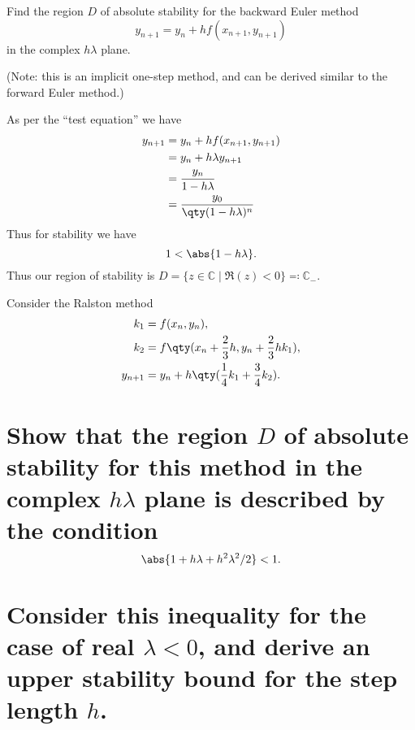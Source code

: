 \documentclass[boxes,pages]{homework}
\begin{document}
\begin{problem}
Find the region $D$ of absolute stability for the backward Euler method
\[
	y_{n+1} = y_n + hf(x_{n+1}, y_{n+1})
\]
in the complex $h\lambda$ plane.

(Note: this is an implicit one-step method, and can be derived similar to the forward Euler method.)
\end{problem}

\begin{solution}
	As per the ``test equation'' we have
	\begin{align*}
		y_{n+1} & = y_n + hf(x_{n+1}, y_{n+1})       \\
		        & = y_n + h\lambda y_{n+1}           \\
		        & = \frac{y_n}{1 - h\lambda}         \\
		        & = \frac{y_0}{\qty(1 - h\lambda)^n}
	\end{align*}
	Thus for stability we have
	\begin{equation*}
		1 < \abs{1 - h\lambda}.
	\end{equation*}
	Thus our region of stability is $D = \{z\in\mathbb{C}\mid \Re(z) < 0 \} \eqqcolon \mathbb{C}_-$.
\end{solution}

\begin{problem}
Consider the Ralston method
\begin{align*}
	k_1     & = f(x_n, y_n),                                      \\
	k_2     & = f\qty(x_n + \frac{2}{3}h, y_n + \frac{2}{3}hk_1), \\
	y_{n+1} & = y_n + h\qty(\frac{1}{4}k_1 + \frac{3}{4}k_2).
\end{align*}
\begin{parts}
	\part{Show that the region $D$ of absolute stability for this method in the complex $h\lambda$ plane is described by the condition\[\abs{1 + h\lambda + h^2\lambda^2/2} < 1.\]}\label{part:7a}
	\part{Consider this inequality for the case of real $\lambda < 0$, and derive an upper stability bound for the step length $h$.}\label{part:7b}
\end{parts}
\end{problem}
\end{document}
